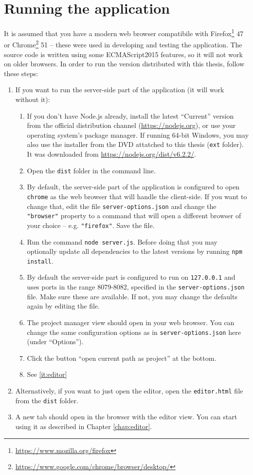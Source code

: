\section{Running the application}
It is assumed that you have a modern web browser compatibile with Firefox\footnote{\url{
https://www.mozilla.org/firefox}} 47 or Chrome\footnote{\url{https://www.google.com/chrome/browser/desktop/}} 51 -- these were used in developing and testing the application. The source code is written using some ECMAScript2015 features, so it will not work on older browsers. In order to run the version distributed with this thesis, follow these steps:
\begin{enumerate}
    \item If you want to run the server-side part of the application (it will work without it):
    \begin{enumerate}
        \item If you don't have Node.js already, install the latest ``Current'' version from the official distribution channel (\url{https://nodejs.org}), or use your operating system's package manager. If running 64-bit Windows, you may also use the installer from the DVD attatched to this thesis (\texttt{ext} folder). It was downloaded from \url{https://nodejs.org/dist/v6.2.2/}.
        \item Open the \texttt{dist} folder in the command line.
        \item By default, the server-side part of the application is configured to open \texttt{chrome} as the web browser that will handle the client-side. If you want to change that, edit the file \texttt{server-options.json} and change the \texttt{"browser"} property to a command that will open a different browser of your choice -- e.g. \texttt{"firefox"}. Save the file.
        \item Run the command \texttt{node server.js}. Before doing that you may optionally update all dependencies to the latest versions by running \texttt{npm install}.
        \item By default the server-side part is configured to run on \texttt{127.0.0.1} and uses ports in the range 8079-8082, specified in the \texttt{server-options.json} file. Make sure these are available. If not, you may change the defaults again by editing the file.
        \item The project manager view should open in your web browser. You can change the same configuration options as in \texttt{server-options.json} here (under ``Options'').
        \item Click the button ``open current path as project'' at the bottom.
        \item See \ref{it:editor}
    \end{enumerate}
    \item Alternatively, if you want to just open the editor, open the \texttt{editor.html} file from the \texttt{dist} folder.
    \item\label{it:editor} A new tab should open in the browser with the editor view. You can start using it as described in Chapter \ref{chap:editor}.
\end{enumerate}


